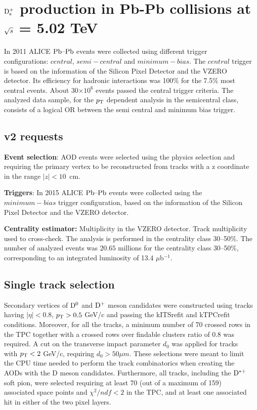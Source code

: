 \chapter{${\rm D_s^+}$ production in Pb-Pb collisions at $\sqrt{s}$ = 5.02 TeV}
In 2011 ALICE $\mbox{Pb--Pb}$ events were collected using different trigger configurations: $central$, $semi-central$ and $minimum-bias$.  The $central$ trigger is based on the information of the Silicon Pixel Detector and the VZERO detector. Its efficiency for hadronic interactions was 100$\%$ for the 7.5$\%$ most central events.  About 30$\times 10^6$ events passed the central trigger criteria. The analyzed data sample, for the $p_{\rm T}$ dependent analysis in the semicentral  class, consists of a logical OR between the semi central and minimum bias trigger.

\section{v2 requests}
{\bf Event selection}: AOD events were selected using the physics selection and requiring the primary vertex to be reconstructed from tracks with a z coordinate in the range $|z|<10$~cm.

{\bf Triggers}: In 2015 ALICE $\mbox{Pb--Pb}$ events were collected using the $minimum-bias$ trigger configuration, based on the information of the Silicon Pixel Detector and the VZERO detector. 

{\bf Centrality estimator:} Multiplicity in the VZERO detector. Track 
multiplicity used to cross-check. The analysis is performed in the
centrality class 30--50\%. The number of analyzed events was $20.65$
millions for the centrality class 30--50\%, corresponding to an
integrated luminosity of 13.4 $\mu$b$^{-1}$.


\section{Single track selection}

Secondary vertices of ${\rm D^0}$ and ${\rm D^+}$ meson candidates were constructed using tracks
having $|\eta| < 0.8$, $p_{\rm T} > 0.5$ GeV/c and passing the kITSrefit and kTPCrefit conditions. 
Moreover, for all the tracks,  a minimum number of 70 crossed rows in the TPC together with a crossed rows over findable clusters ratio of 0.8 was required.
A cut on the transverse impact parameter $d_0$ was applied for tracks with $p_{\rm T} < 2$ GeV/c, requiring $d_0 >50 \mu m$. These selections
were meant to limit the CPU time needed to perform the track combinatorics when creating the
AODs with the D meson candidates. Furthermore, all tracks, including the ${\rm D^{*+}}$ soft pion, were 
selected requiring at least
70 (out of a maximum of 159) associated space points and $\chi^2/ndf < 2$ in the TPC, and
at least one associated hit in either of the two pixel layers. 
